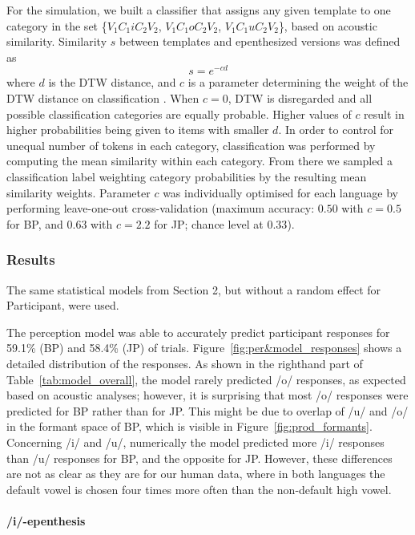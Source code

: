For the simulation, we built a classifier that assigns any given template to one category in the set \{$V_{1}C_{1}iC_{2}V_{2}$, $V_{1}C_{1}oC_{2}V_{2}$, $V_{1}C_{1}uC_{2}V_{2}$\}, based on acoustic similarity. Similarity $s$ between templates and epenthesized versions was defined as
% 
\begin{equation}
  s = e^{-cd}
  \label{eq1}
\end{equation}
% 
where $d$ is the DTW distance, and $c$ is a parameter determining the weight of the DTW distance on classification \cite{nosofsky1992}. When $c = 0$, DTW is disregarded and all possible classification categories are equally probable. Higher values of $c$ result in higher probabilities being given to items with smaller $d$. In order to control for unequal number of tokens in each category, classification was performed by computing the mean similarity within each category. From there we sampled a classification label weighting category probabilities by the resulting mean similarity weights. Parameter $c$ was individually optimised for each language by performing leave-one-out cross-validation (maximum accuracy: $0.50$ with $c = 0.5$ for BP, and $0.63$ with $c = 2.2$ for JP; chance level at $0.33$). 

\subsubsection{Results}

The same statistical models from Section 2, but without a random effect for Participant, were used.

The perception model was able to accurately predict participant responses for 59.1\% (BP) and 58.4\% (JP) of trials. Figure~\ref{fig:per&model_responses} shows a detailed distribution of the responses. As shown in the righthand part of Table~\ref{tab:model_overall}, the model rarely predicted /o/ responses, as expected based on acoustic analyses; however, it is surprising that most /o/ responses were predicted for BP rather than for JP. This might be due to overlap of /u/ and /o/ in the formant space of BP, which is visible in Figure~\ref{fig:prod_formants}.
Concerning /i/ and /u/, numerically the model predicted more /i/ responses than /u/ responses for BP, and the opposite for JP. However, these differences are not as clear as they are for our human data, where in both languages the default vowel is chosen four times more often than the non-default high vowel.  

\paragraph{/i/-epenthesis}

